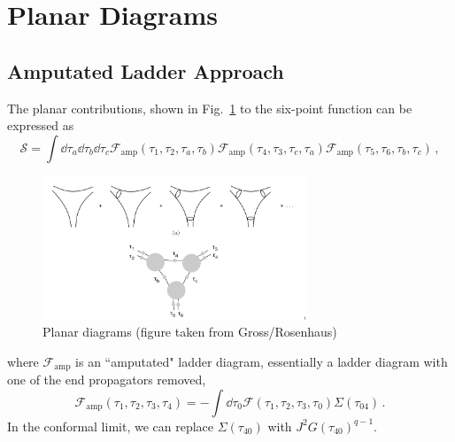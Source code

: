 \documentclass[aps,prx,preprint,onecolumn,citeautoscript,footinbib]{revtex4-1}
\begin{document}
\section{Planar Diagrams}
\subsection{Amputated Ladder Approach}
The planar contributions, shown in Fig.~\ref{fig:planar} to the six-point function can be expressed as
\begin{equation}
    \mathcal{S} = \int \dd{\tau_a} \dd{\tau_b} \dd{\tau_c} \mathcal{F}_{\text{amp}}(\tau_1, \tau_2, \tau_a, \tau_b)
     \mathcal{F}_{\text{amp}}(\tau_4, \tau_3, \tau_c, \tau_a)
      \mathcal{F}_{\text{amp}}(\tau_5, \tau_6, \tau_b, \tau_c)\,,
      \label{eq:planarIntegral}
\end{equation}
\begin{figure}
    \centering
    \includegraphics[width=0.7\textwidth]{planar.png}
    \caption{Planar diagrams (figure taken from Gross/Rosenhaus)}
    \label{fig:planar}
\end{figure}
where $\mathcal{F}_{\text{amp}}$ is an ``amputated" ladder diagram, essentially a ladder diagram with one of the end propagators removed,
\begin{equation}
    \mathcal{F}_{\text{amp}}(\tau_1, \tau_2, \tau_3, \tau_4) = - \int \dd{\tau_0} \mathcal{F}(\tau_1, \tau_2, \tau_3, \tau_0) \Sigma(\tau_{04})\,.
\end{equation}
In the conformal limit, we can replace $\Sigma(\tau_{40})$ with $J^2 G(\tau_{40})^{q-1}$.
\end{document}
